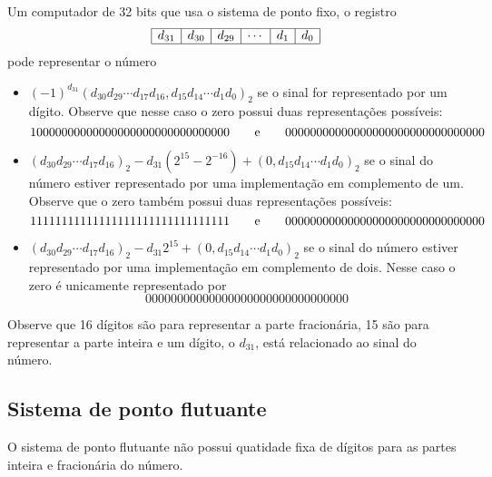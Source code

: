 \begin{ex} Um computador de 32 bits que usa o sistema de ponto fixo, o registro
$$
\begin{array}{|c|c|c|c|c|c|} \hline
d_{31}&d_{30}&d_{29}&\cdots&d_1&d_0\\\hline
\end{array}
$$
pode representar o número
\begin{itemize}
\item $(-1)^{d_{31}}(d_{30}d_{29}\cdots d_{17}d_{16},d_{15}d_{14}\cdots d_1d_0)_2$
se o sinal for representado por um dígito. Observe que nesse caso o zero possui duas representações possíveis: 
$$
10000000000000000000000000000000\qquad \hbox{e}\qquad 00000000000000000000000000000000
$$
\item $(d_{30}d_{29}\cdots d_{17}d_{16})_2-d_{31}(2^{15}-2^{-16})+(0,d_{15}d_{14}\cdots d_1d_0)_2$
se o sinal do número estiver representado por uma implementação em complemento de um. Observe que o zero também possui duas representações possíveis: 
$$
11111111111111111111111111111111\qquad \hbox{e}\qquad 00000000000000000000000000000000
$$
\item $(d_{30}d_{29}\cdots d_{17}d_{16})_2-d_{31}2^{15}+(0,d_{15}d_{14}\cdots d_1d_0)_2$
se o sinal do número estiver representado por uma implementação em complemento de dois. Nesse caso o zero é unicamente representado por
$$
00000000000000000000000000000000
$$
\end{itemize}



Observe que 16 dígitos são para representar a parte fracionária, 15 são para representar a parte inteira e um dígito, o $d_{31}$, está relacionado ao sinal do número. 
\end{ex}

\subsection{Sistema de ponto flutuante}
O sistema de ponto flutuante não possui quatidade fixa de dígitos para as partes inteira e fracionária do número. 

